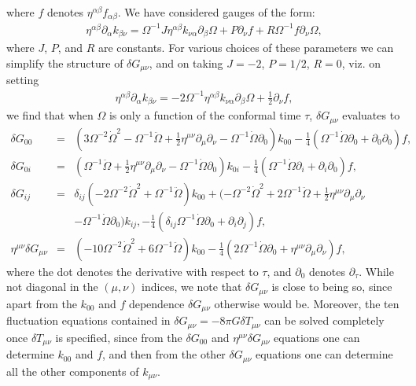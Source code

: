 %
where $f$ denotes $\eta^{\alpha\beta}f_{\alpha\beta}$. We have considered gauges of the form:
%
\begin{eqnarray}
\eta^{\alpha\beta}\partial_{\alpha}k_{\beta\nu} = \Omega^{-1} J \eta^{\alpha\beta}k_{\nu\alpha}\partial_\beta \Omega + P \partial_\nu f+ R \Omega^{-1} f\partial_\nu \Omega,
\label{D2}
\end{eqnarray}
%
where $J$, $P$, and $R$ are constants. For various choices of these parameters we can simplify the structure of $\delta G_{\mu\nu}$, and on taking  $J = -2$, $P = 1/2$, $R = 0$, viz. on setting
%
\begin{eqnarray}
\eta^{\alpha\beta}\partial_{\alpha}k_{\beta\nu} = -2 \Omega^{-1}  \eta^{\alpha\beta}k_{\nu\alpha}\partial_\beta \Omega + \tfrac{1}{2} \partial_\nu f,
\label{D3}
\end{eqnarray}
%
we find that when $\Omega$ is only a function of the conformal time $\tau$, $\delta G_{\mu\nu}$ evaluates  to 
%
\begin{eqnarray}
\delta G_{00}&=&
(3 \Omega^{-2} \dot{\Omega}^2 -  \Omega^{-1} \ddot{\Omega} + \tfrac{1}{2} \eta^{\mu \nu} \partial_{\mu} \partial_{\nu} -  \Omega^{-1} \dot{\Omega} \partial_{0}) k_{00} - \tfrac{1}{4} ( \Omega^{-1} \dot{\Omega} \partial_{0} + \partial_{0} \partial_{0}) f,
\nonumber\\
\delta G_{0i}&=&
(\Omega^{-1} \ddot{\Omega} + \tfrac{1}{2} \eta^{\mu \nu} \partial_{\mu} \partial_{\nu} -  \Omega^{-1} \dot{\Omega} \partial_{0}) k_{0i} - \tfrac{1}{4}  (\Omega^{-1} \dot{\Omega} \partial_{i} +\partial_{i} \partial_{0}) f,
\nonumber\\
\delta G_{ij}&=&
\delta_{ij}(-2 \Omega^{-2} \dot{\Omega}^2 + \Omega^{-1} \ddot{\Omega}) k_{00} + (- \Omega^{-2} \dot{\Omega}^2 + 2 \Omega^{-1} \ddot{\Omega} + \tfrac{1}{2} \eta^{\mu \nu} \partial_{\mu} \partial_{\nu}  
\nonumber\\
&&-  \Omega^{-1} \dot{\Omega} \partial_{0}) k_{ij}, 
- \tfrac{1}{4} (\delta_{ij} \Omega^{-1} \dot{\Omega} \partial_{0} + \partial_{i} \partial_{j}) f,
\nonumber\\
\eta^{\mu\nu}\delta G_{\mu\nu}&=&(-10\Omega^{-2} \dot{\Omega}^2 +6  \Omega^{-1} \ddot{\Omega})k_{00}- \tfrac{1}{4}  (2\Omega^{-1} \dot{\Omega} \partial_{0} +\eta^{\mu\nu}\partial_{\mu}\partial_{\nu}) f,
\label{D4}
\end{eqnarray}
%
where the dot denotes the derivative with respect to $\tau$, and $\partial_0$ denotes $\partial_{\tau}$. While not diagonal in the $(\mu,\nu)$ indices, we note that $\delta G_{\mu\nu}$ is close to being so, since apart from  the $k_{00}$ and $f$ dependence  $\delta G_{\mu\nu}$ otherwise would be. Moreover, the ten fluctuation equations contained in  $\delta G_{\mu\nu}=-8\pi G \delta T_{\mu\nu}$ can be solved completely once $\delta T_{\mu\nu}$ is specified, since from the $\delta G_{00}$ and $\eta^{\mu\nu}\delta G_{\mu\nu}$ equations one can determine $k_{00}$ and $f$, and then from the other $\delta G_{\mu\nu}$ equations one can determine all the other components of $k_{\mu\nu}$. 


